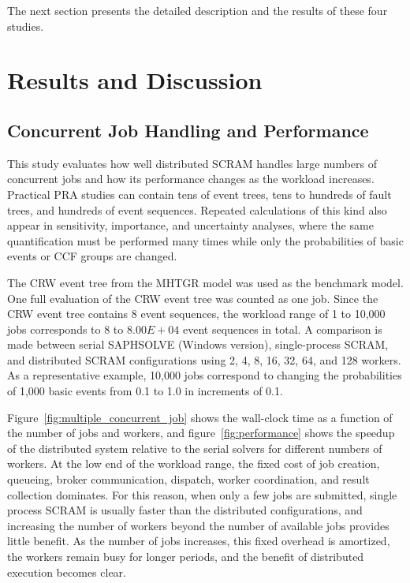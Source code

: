 The next section presents the detailed description and the results of these four studies.

\section{Results and Discussion}
\subsection{Concurrent Job Handling and Performance}
This study evaluates how well distributed SCRAM handles large numbers of concurrent jobs and how its performance changes as the workload increases. Practical PRA studies can contain tens of event trees, tens to hundreds of fault trees, and hundreds of event sequences. Repeated calculations of this kind also appear in sensitivity, importance, and uncertainty analyses, where the same quantification must be performed many times while only the probabilities of basic events or CCF groups are changed.

The CRW event tree from the MHTGR model was used as the benchmark model. One full evaluation of the CRW event tree was counted as one job. Since the CRW event tree contains 8 event sequences, the workload range of 1 to 10{,}000 jobs corresponds to 8 to $8.00E+04$ event sequences in total. A comparison is made between serial SAPHSOLVE (Windows version), single-process SCRAM, and distributed SCRAM configurations using 2, 4, 8, 16, 32, 64, and 128 workers. As a representative example, 10{,}000 jobs correspond to changing the probabilities of 1{,}000 basic events from 0.1 to 1.0 in increments of 0.1.




Figure~\ref{fig:multiple_concurrent_job} shows the wall-clock time as a function of the number of jobs and workers, and figure~\ref{fig:performance} shows the speedup of the distributed system relative to the serial solvers for different numbers of workers. At the low end of the workload range, the fixed cost of job creation, queueing, broker communication, dispatch, worker coordination, and result collection dominates. For this reason, when only a few jobs are submitted, single process SCRAM is usually faster than the distributed configurations, and increasing the number of workers beyond the number of available jobs provides little benefit. As the number of jobs increases, this fixed overhead is amortized, the workers remain busy for longer periods, and the benefit of distributed execution becomes clear.

